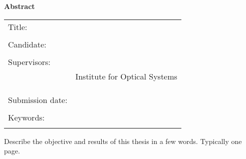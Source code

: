 \thispagestyle{plain}
\vspace*{11pt}
\begin{center}
	{\LARGE \textbf{\textsf{Abstract}}}
\end{center}

\bigskip

\begin{center}
	\begin{tabular}{p{3.2cm}p{9.6cm}}
		Title: & \thema \\
		 & \\
		Candidate: & \autor \\
		 & \\
		Supervisors: & \prueferA \\[.5ex]
		 & Institute for Optical Systems\\[3ex]
		 & \prueferB \\[.5ex]
		 & \firma \\
		 & \\
		Submission date: & \abgabedatum \\
		 & \\
		Keywords: & \schlagworte \\
		 & \\
	\end{tabular}
\end{center}

\bigskip

\noindent

Describe the objective and results of this thesis in a few words.
Typically one page.

\newpage

